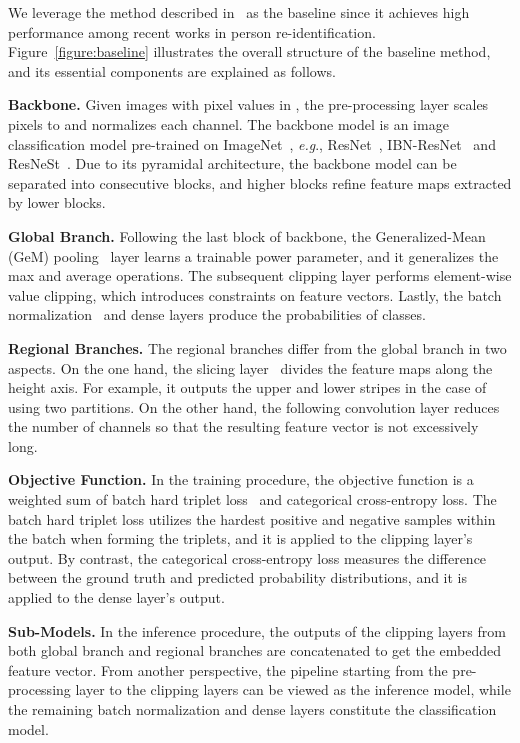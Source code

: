 \documentclass{article}
\def\onedot{.}
\def\eg{\emph{e.g}\onedot} \def\Eg{\emph{E.g}\onedot}
\begin{document}
We leverage the method described in~\cite{ni2021adaptive} as the baseline since it achieves high performance among recent works in person re-identification.
Figure~\ref{figure:baseline} illustrates the overall structure of the baseline method, and its essential components are explained as follows.

\noindent\textbf{Backbone.}
Given images with pixel values in , the pre-processing layer scales pixels to  and normalizes each channel.
The backbone model is an image classification model pre-trained on ImageNet~\cite{deng2009imagenet}, \eg, ResNet~\cite{he2016deep}, IBN-ResNet~\cite{pan2018two} and ResNeSt~\cite{zhang2020resnest}.
Due to its pyramidal architecture, the backbone model can be separated into consecutive blocks, and higher blocks refine feature maps extracted by lower blocks.

\noindent\textbf{Global Branch.}
Following the last block of backbone, the Generalized-Mean (GeM) pooling~\cite{radenovic2018fine} layer learns a trainable power parameter, and it generalizes the max and average operations.
The subsequent clipping layer performs element-wise value clipping, which introduces constraints on feature vectors.
Lastly, the batch normalization~\cite{ioffe2015batch} and dense layers produce the probabilities of classes.

\noindent\textbf{Regional Branches.}
The regional branches differ from the global branch in two aspects.
On the one hand, the slicing layer~\cite{sun2018beyond} divides the feature maps along the height axis.
For example, it outputs the upper and lower stripes in the case of using two partitions.
On the other hand, the following convolution layer reduces the number of channels so that the resulting feature vector is not excessively long.

\noindent\textbf{Objective Function.}
In the training procedure, the objective function is a weighted sum of batch hard triplet loss~\cite{hermans2017defense} and categorical cross-entropy loss.
The batch hard triplet loss utilizes the hardest positive and negative samples within the batch when forming the triplets, and it is applied to the clipping layer's output.
By contrast, the categorical cross-entropy loss measures the difference between the ground truth and predicted probability distributions, and it is applied to the dense layer's output.

\noindent\textbf{Sub-Models.}
In the inference procedure, the outputs of the clipping layers from both global branch and regional branches are concatenated to get the embedded feature vector.
From another perspective, the pipeline starting from the pre-processing layer to the clipping layers can be viewed as the inference model, while the remaining batch normalization and dense layers constitute the classification model.
\end{document}
